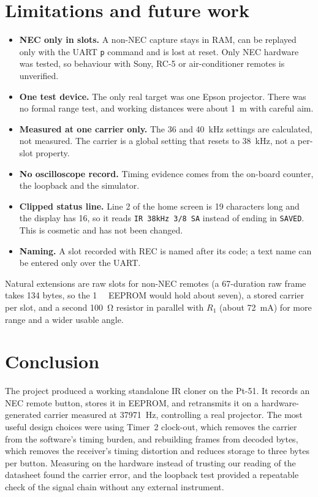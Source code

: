\documentclass[11pt,a4paper]{article}
\newcommand{\code}[1]{\texttt{#1}}
\begin{document}
\section{Limitations and future work}
\label{sec:limits}

\begin{itemize}
\item \textbf{NEC only in slots.} A non-NEC capture stays in RAM, can be replayed only with the UART \code{p} command and is lost at reset. Only NEC hardware was tested, so behaviour with Sony, RC-5 or air-conditioner remotes is unverified.
\item \textbf{One test device.} The only real target was one Epson projector. There was no formal range test, and working distances were about \qty{1}{\metre} with careful aim.
\item \textbf{Measured at one carrier only.} The 36 and \qty{40}{\kilo\hertz} settings are calculated, not measured. The carrier is a global setting that resets to \qty{38}{\kilo\hertz}, not a per-slot property.
\item \textbf{No oscilloscope record.} Timing evidence comes from the on-board counter, the loopback and the simulator.
\item \textbf{Clipped status line.} Line 2 of the home screen is 19 characters long and the display has 16, so it reads \code{IR 38kHz  3/8 SA} instead of ending in \code{SAVED}. This is cosmetic and has not been changed.
\item \textbf{Naming.} A slot recorded with REC is named after its code; a text name can be entered only over the UART.
\end{itemize}

Natural extensions are raw slots for non-NEC remotes (a 67-duration raw frame takes 134 bytes, so the \qty{1}{\kilo\byte} EEPROM would hold about seven), a stored carrier per slot, and a second \qty{100}{\ohm} resistor in parallel with $R_1$ (about \qty{72}{\milli\ampere}) for more range and a wider usable angle.

\section{Conclusion}

The project produced a working standalone IR cloner on the Pt-51. It records an NEC remote button, stores it in EEPROM, and retransmits it on a hardware-generated carrier measured at \qty{37971}{\hertz}, controlling a real projector. The most useful design choices were using Timer~2 clock-out, which removes the carrier from the software's timing burden, and rebuilding frames from decoded bytes, which removes the receiver's timing distortion and reduces storage to three bytes per button. Measuring on the hardware instead of trusting our reading of the datasheet found the carrier error, and the loopback test provided a repeatable check of the signal chain without any external instrument.
\end{document}
